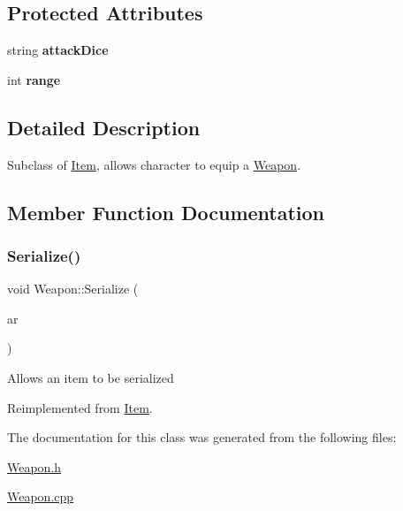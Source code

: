 \subsection*{Protected Attributes}
\begin{DoxyCompactItemize}
\item 
\hypertarget{class_weapon_a034430020bc2fefd021253b49014c334}{}\label{class_weapon_a034430020bc2fefd021253b49014c334} 
string {\bfseries attack\+Dice}
\item 
\hypertarget{class_weapon_a13cc71a89d0cf076f58a040767682478}{}\label{class_weapon_a13cc71a89d0cf076f58a040767682478} 
int {\bfseries range}
\end{DoxyCompactItemize}


\subsection{Detailed Description}
Subclass of \hyperlink{class_item}{Item}, allows character to equip a \hyperlink{class_weapon}{Weapon}. 

\subsection{Member Function Documentation}
\hypertarget{class_weapon_a1c30e8f2add0a1aa8558cfbff13ad728}{}\label{class_weapon_a1c30e8f2add0a1aa8558cfbff13ad728} 
\subsubsection{\texorpdfstring{Serialize()}{Serialize()}}
{\footnotesize\ttfamily void Weapon\+::\+Serialize (\begin{DoxyParamCaption}\item[{C\+Archive \&}]{ar }\end{DoxyParamCaption})\hspace{0.3cm}{\ttfamily [virtual]}}

Allows an item to be serialized 

Reimplemented from \hyperlink{class_item_ad1eae21e57fc3ce3252080a4efbfb8e8}{Item}.



The documentation for this class was generated from the following files\+:\begin{DoxyCompactItemize}
\item 
\hyperlink{_weapon_8h}{Weapon.\+h}\item 
\hyperlink{_weapon_8cpp}{Weapon.\+cpp}\end{DoxyCompactItemize}
